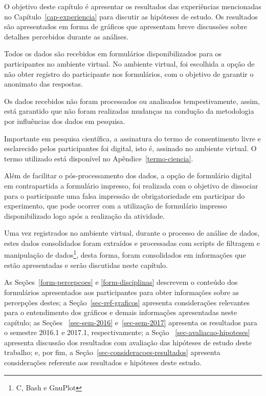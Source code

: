 

\label{cap-resultados}
\acresetall

O objetivo deste capítulo é apresentar os resultados das experiências
mencionadas no Capítulo~\ref{cap-experiencia} para discutir as
hipóteses de estudo.
Os resultados são apresentados em forma de gráficos que apresentam
breve discussões sobre detalhes percebidos durante as análises.

Todos os dados são recebidos em formulários
disponibilizados para os participantes no ambiente virtual.
No ambiente virtual, foi escolhida a opção de não
obter registro do participante nos formulários, com o objetivo
de garantir o anonimato das respostas.

Os dados recebidos não foram processados ou analisados
tempestivamente, assim, está garantido que não foram
realizadas mudanças na condução da metodologia
por influências dos dados em pesquisa.

Importante em pesquisa científica, a assinatura do termo
de consentimento livre e esclarecido pelos participantes foi digital,
isto é, assinado no ambiente virtual.
O termo utilizado está disponível no Apêndice~\ref{termo-ciencia}.

Além de facilitar o pós-processamento dos dados, a opção de
formulário digital em contrapartida a formulário impresso, foi
realizada com o objetivo de dissociar para o participante
uma falsa impressão de obrigatoriedade em participar do experimento,
que pode ocorrer com a utilização de formulário impresso disponibilizado
logo após a realização da atividade.


Uma vez registrados no ambiente virtual, durante o processo de análise de dados,
estes dados consolidados foram extraídos e processadas com scripts de filtragem
e manipulação de dados\footnote{C, Bash e GnuPlot}, desta forma, foram consolidados em informações que estão
apresentadas e serão discutidas neste capítulo.

As Seções~\ref{form-percepcoes} e \ref{form-disciplinas} descrevem
o conteúdo dos formulários apresentados aos participantes para obter
informações sobre as percepções destes;
a Seção~\ref{sec-ref-graficos} apresenta considerações relevantes para o
entendimento dos gráficos e demais informações apresentadas neste capítulo;
as Seções ~\ref{sec-sem-2016} e~\ref{sec-sem-2017}
apresenta os resultados para o semestre 2016.1 e 2017.1, respectivamente;
a Seção ~\ref{sec-avaliacao-hipoteses} apresenta discussão dos resultados
com avaliação das hipóteses de estudo deste trabalho;
e, por fim, a Seção~\ref{sec-consideracoes-resultados} apresenta
considerações referente aos resultados e hipóteses
deste estudo.

